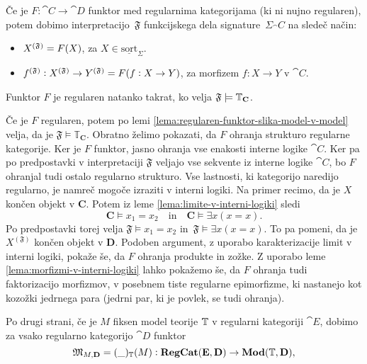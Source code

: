 \documentclass[../kategoricna_logika.tex]{subfiles}
\begin{document}
\begin{lema}\label{lema:regularen-funktor-v-interni-logiki}
Če je $F : \cat{C} \to \cat{D}$ funktor
med regularnima kategorijama (ki ni nujno regularen), potem dobimo
interpretacijo~$\mathfrak{F}$ funkcijskega dela
signature~$\Sigma_\cat{C}$ na sledeč način:
\begin{itemize}
\item $\interp[\mathfrak{F}]{X} = F(X)$, za
  $X \in \underline{\mathrm{sort}}_{\Sigma}$.
\item
  $\interp[\mathfrak{F}]{f} : \interp[\mathfrak{F}]{X} \to
  \interp[\mathfrak{F}]{Y} = F(f : X \to Y)$, za morfizem $f: X \to Y$
  v $\cat{C}$.
\end{itemize}
  Funktor $F$ je regularen natanko takrat, ko velja
  $\mathfrak{F} \models \T_\cat{C}$.
\end{lema}
\begin{dokaz}
  Če je $F$ regularen, potem po lemi
  \ref{lema:regularen-funktor-slika-model-v-model} velja, da je
  $\mathfrak{F} \models \mathbb{T}_{\mathbf{C}}$.  Obratno želimo
  pokazati, da $F$ ohranja strukturo regularne kategorije. Ker je $F$
  funktor, jasno ohranja vse enakosti interne logike $\cat{C}$. Ker pa
  po predpostavki v interpretaciji $\mathfrak{F}$ veljajo vse sekvente
  iz interne logike $\cat{C}$, bo $F$ ohranjal tudi ostalo regularno
  strukturo. Vse lastnosti, ki kategorijo naredijo regularno, je namreč
  mogoče izraziti v interni logiki. Na primer recimo, da
  je $X$ končen objekt v $\mathbf{C}$. Potem iz leme
  \ref{lema:limite-v-interni-logiki} sledi
  \[ \mathbf{C} \models x_{1} = x_{2}\quad \text{in} \quad \mathbf{C}
    \models \exists x (x = x).\] Po predpostavki torej velja
  $\mathfrak{F} \models x_{1} = x_{2}$
  in~${\mathfrak{F} \models \exists x (x = x)}$.  To pa pomeni, da je
  $X^{(\mathfrak{F})}$ končen objekt v $\mathbf{D}$.
  Podoben argument, z uporabo karakterizacije limit v interni logiki, pokaže
  še, da $F$ ohranja produkte in zožke.  Z uporabo leme
  \ref{lema:morfizmi-v-interni-logiki} lahko pokažemo še, da $F$
  ohranja tudi faktorizacijo morfizmov, v posebnem tiste regularne
  epimorfizme, ki nastanejo kot kozožki jedrnega para (jedrni par,
  ki je povlek, se tudi ohranja).
\end{dokaz}
Po drugi strani, če je $M$ fiksen model teorije $\T$ v regularni
kategoriji $\cat{E}$, dobimo za vsako regularno kategorijo $\cat{D}$
funktor
\begin{equation}\label{equation:def-funktor-iz-regcat-v-mod}
  \mathfrak{M}_{M,\cat{D}} = (\_)_\T(M): \cat{RegCat}(\cat{E}, \cat{D}) \to \Mod(\T, \cat{D}),
\end{equation}
\end{document}
